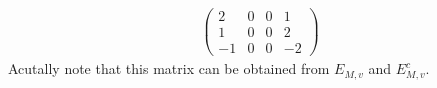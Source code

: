 \documentclass{mc2013}
\newcommand\bs{\boldsymbol}
\newcommand\tf{\varphi}
\renewcommand{\(}{\left(}
\renewcommand{\)}{\right)}
\renewcommand{\[}{\left[}
\renewcommand{\]}{\right]}
\begin{document}
\begin{itemize}
\begin{equation}
\begin{split}
\begin{pmatrix}
2 & 0 & 0 & 1 \\
1 & 0 & 0 & 2 \\
-1 & 0 & 0 & -2
\end{pmatrix}
\end{split}
\end{equation}
Acutally note that this matrix can be obtained from $E_{M,v}$ and $E_{M,v}^c$.

\end{itemize}
\end{document}
